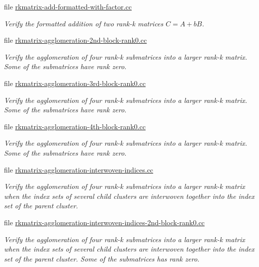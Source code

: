 \begin{DoxyCompactItemize}
file \hyperlink{rkmatrix-add-formatted-with-factor_8cc}{rkmatrix-\/add-\/formatted-\/with-\/factor.\+cc}
\begin{DoxyCompactList}\small\item\em Verify the formatted addition of two rank-\/k matrices $C = A + b B$. \end{DoxyCompactList}\item 
file \hyperlink{rkmatrix-agglomeration-2nd-block-rank0_8cc}{rkmatrix-\/agglomeration-\/2nd-\/block-\/rank0.\+cc}
\begin{DoxyCompactList}\small\item\em Verify the agglomeration of four rank-\/k submatrices into a larger rank-\/k matrix. Some of the submatrices have rank zero. \end{DoxyCompactList}\item 
file \hyperlink{rkmatrix-agglomeration-3rd-block-rank0_8cc}{rkmatrix-\/agglomeration-\/3rd-\/block-\/rank0.\+cc}
\begin{DoxyCompactList}\small\item\em Verify the agglomeration of four rank-\/k submatrices into a larger rank-\/k matrix. Some of the submatrices have rank zero. \end{DoxyCompactList}\item 
file \hyperlink{rkmatrix-agglomeration-4th-block-rank0_8cc}{rkmatrix-\/agglomeration-\/4th-\/block-\/rank0.\+cc}
\begin{DoxyCompactList}\small\item\em Verify the agglomeration of four rank-\/k submatrices into a larger rank-\/k matrix. Some of the submatrices have rank zero. \end{DoxyCompactList}\item 
file \hyperlink{rkmatrix-agglomeration-interwoven-indices_8cc}{rkmatrix-\/agglomeration-\/interwoven-\/indices.\+cc}
\begin{DoxyCompactList}\small\item\em Verify the agglomeration of four rank-\/k submatrices into a larger rank-\/k matrix when the index sets of several child clusters are interwoven together into the index set of the parent cluster. \end{DoxyCompactList}\item 
file \hyperlink{rkmatrix-agglomeration-interwoven-indices-2nd-block-rank0_8cc}{rkmatrix-\/agglomeration-\/interwoven-\/indices-\/2nd-\/block-\/rank0.\+cc}
\begin{DoxyCompactList}\small\item\em Verify the agglomeration of four rank-\/k submatrices into a larger rank-\/k matrix when the index sets of several child clusters are interwoven together into the index set of the parent cluster. Some of the submatrices has rank zero. \end{DoxyCompactList}\item 

\end{DoxyCompactItemize}
